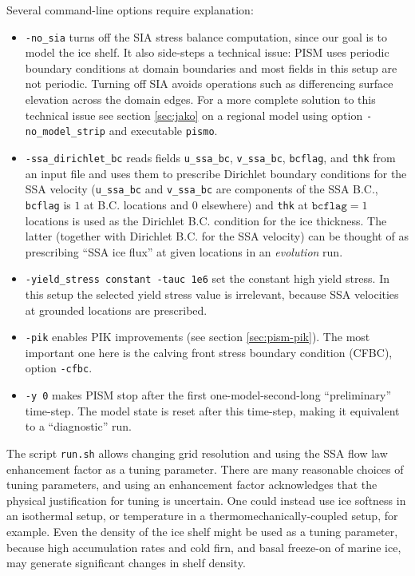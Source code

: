 \noindent Several command-line options require explanation:
\begin{itemize}
\item \texttt{-no_sia} turns off the SIA stress balance computation, since our
  goal is to model the ice shelf. It also side-steps a technical issue: PISM
  uses periodic boundary conditions at domain boundaries and most fields in
  this setup are not periodic. Turning off SIA avoids operations such as
  differencing surface elevation across the domain edges.  For a more complete
  solution to this technical issue see section \ref{sec:jako} on a regional model using
  option \verb|-no_model_strip| and executable \verb|pismo|.
\item \texttt{-ssa_dirichlet_bc} reads fields \texttt{u_ssa_bc}, \texttt{v_ssa_bc}, \texttt{bcflag}, and \texttt{thk} from an input file and uses them to prescribe Dirichlet boundary conditions for the SSA velocity (\texttt{u_ssa_bc} and \texttt{v_ssa_bc} are components of the SSA B.C., \texttt{bcflag} is $1$ at B.C. locations and $0$ elsewhere) and \texttt{thk} at $\mathtt{bcflag} = 1$ locations is used as the Dirichlet B.C. condition for the ice thickness. The latter (together with Dirichlet B.C. for the SSA velocity) can be thought of as prescribing ``SSA ice flux'' at given locations in an \emph{evolution} run.
\item \texttt{-yield_stress constant -tauc 1e6} set the constant high yield stress. In this setup the selected yield stress value is irrelevant, because SSA velocities at grounded locations are prescribed.
\item \texttt{-pik} enables PIK improvements (see section \ref{sec:pism-pik}). The most important one here is the calving front stress boundary condition (CFBC), option \verb|-cfbc|.
\item \texttt{-y 0} makes PISM stop after the first one-model-second-long ``preliminary'' time-step.  The model state is reset after this time-step, making it equivalent to a ``diagnostic'' run.
\end{itemize}

The script \texttt{run.sh} allows changing grid resolution and using the SSA flow law enhancement factor as a tuning parameter.  There are many reasonable choices of tuning parameters, and using an enhancement factor acknowledges that the physical justification for tuning is uncertain.  One could instead use ice softness in an isothermal setup, or temperature in a thermomechanically-coupled setup, for example.  Even the density of the ice shelf might be used as a tuning parameter, because high accumulation rates and cold firn, and basal freeze-on of marine ice, may generate significant changes in shelf density.

